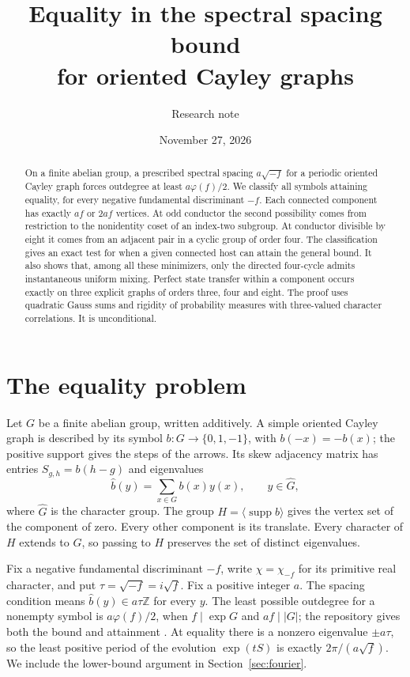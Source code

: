 \documentclass[11pt,letterpaper]{article}
\title{Equality in the spectral spacing bound\\for oriented Cayley graphs}
\author{Research note}
\date{November 27, 2026}
\newcommand{\Z}{\mathbb Z}\newcommand{\F}{\mathbb F}\newcommand{\E}{\mathbb E}
\newcommand{\supp}{\operatorname{supp}}\newcommand{\ord}{\operatorname{ord}}
\begin{document}
\maketitle
\begin{abstract}
On a finite abelian group, a prescribed spectral spacing $a\sqrt{-f}$ for a periodic oriented Cayley graph forces outdegree at least $a\varphi(f)/2$. We classify all symbols attaining equality, for every negative fundamental discriminant $-f$. Each connected component has exactly $af$ or $2af$ vertices. At odd conductor the second possibility comes from restriction to the nonidentity coset of an index-two subgroup. At conductor divisible by eight it comes from an adjacent pair in a cyclic group of order four. The classification gives an exact test for when a given connected host can attain the general bound. It also shows that, among all these minimizers, only the directed four-cycle admits instantaneous uniform mixing. Perfect state transfer within a component occurs exactly on three explicit graphs of orders three, four and eight. The proof uses quadratic Gauss sums and rigidity of probability measures with three-valued character correlations. It is unconditional.
\end{abstract}

\section{The equality problem}
Let $G$ be a finite abelian group, written additively. A simple oriented Cayley graph is described by its symbol $b:G\to\{0,1,-1\}$, with $b(-x)=-b(x)$; the positive support gives the steps of the arrows. Its skew adjacency matrix has entries $S_{g,h}=b(h-g)$ and eigenvalues
\[
 \widehat b(y)=\sum_{x\in G} b(x)y(x),\qquad y\in\widehat G,
\]
where $\widehat G$ is the character group. The group $H=\langle\supp b\rangle$ gives the vertex set of the component of zero. Every other component is its translate. Every character of $H$ extends to $G$, so passing to $H$ preserves the set of distinct eigenvalues.

Fix a negative fundamental discriminant $-f$, write $\chi=\chi_{-f}$ for its primitive real character, and put $\tau=\sqrt{-f}=i\sqrt f$. Fix a positive integer $a$. The spacing condition means $\widehat b(y)\in a\tau\Z$ for every $y$. The least possible outdegree for a nonempty symbol is $a\varphi(f)/2$, when $f\mid\exp G$ and $af\mid|G|$; the repository gives both the bound and attainment \cite{repo}. At equality there is a nonzero eigenvalue $\pm a\tau$, so the least positive period of the evolution $\exp(tS)$ is exactly $2\pi/(a\sqrt f)$. We include the lower-bound argument in Section~\ref{sec:fourier}.
\end{document}
